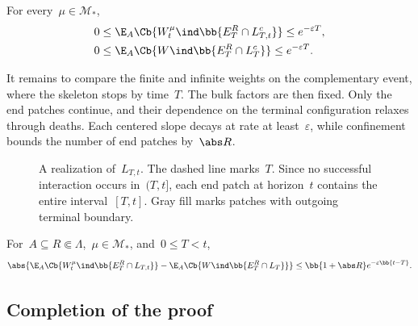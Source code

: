 \begin{lemma}
\label{lem:late-interactions}
For every~$\mu\in\mathcal M_*$,
\begin{align}
0
&\leq
\E_A\Cb{W_t^\mu\ind\bb{E_T^R\cap L_{T,t}^c}}
\leq
e^{-\varepsilon T},
\label{eq:finite-late-interaction-bound}
\\
0
&\leq
\E_A\Cb{W\ind\bb{E_T^R\cap L_T^c}}
\leq
e^{-\varepsilon T}.
\label{eq:limiting-late-interaction-bound}
\end{align}
\end{lemma}

It remains to compare the finite and infinite weights on the complementary
event, where the skeleton stops by time~$T$. The bulk factors are then fixed.
Only the end patches continue, and their dependence on the terminal
configuration relaxes through deaths. Each centered
slope decays at rate at least~$\varepsilon$, while confinement bounds the number
of end patches by~$\abs R$.

\begin{figure}[htbp]
\centering

\caption{A realization of~$L_{T,t}$. The dashed line marks~$T$. Since no
successful interaction occurs in~$(T,t]$, each end patch at horizon~$t$
contains the entire interval~$[T,t]$. Gray fill marks patches with outgoing
terminal boundary.}
\label{fig:no-late-end-patches}
\end{figure}
\FloatBarrier

\begin{lemma}
\label{lem:no-late-relaxation}
For~$A\subseteq R\Subset\Lambda$,~$\mu\in\mathcal M_*$, and~$0\leq T<t$,
\begin{equation}
\label{eq:no-late-relaxation-bound}
\abs{
 \E_A\Cb{W_t^\mu\ind\bb{E_T^R\cap L_{T,t}}}
 -
 \E_A\Cb{W\ind\bb{E_T^R\cap L_T}}
}
\leq
\bb{1+\abs R}e^{-\varepsilon\bb{t-T}}.
\end{equation}
\end{lemma}
\subsection{Completion of the proof}

